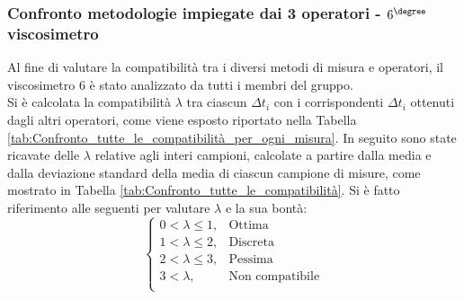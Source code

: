 \documentclass[a4paper,11pt,oneside]{article}
\begin{document}

\subsubsection*{Confronto metodologie impiegate dai 3 operatori - $6^{\degree}$ viscosimetro}%
Al fine di valutare la compatibilità tra i diversi metodi di misura e operatori, il viscosimetro 6 è stato analizzato da tutti i membri del gruppo.\\
Si è calcolata la compatibilità $\lambda$ tra ciascun $\Delta t_i$ con i corrispondenti $\Delta t_i$ ottenuti dagli  altri operatori, come viene esposto riportato nella Tabella \ref{tab:Confronto_tutte_le_compatibilità_per_ogni_misura}.
In seguito sono state ricavate delle $\lambda$ relative agli interi campioni, calcolate a partire dalla media e dalla deviazione standard della media di ciascun campione di misure, come mostrato in Tabella \ref{tab:Confronto_tutte_le_compatibilità}. Si è fatto riferimento alle seguenti per valutare $\lambda$ e la sua bontà:
\begin{equation*}%
    \label{eq:cases}
    \begin{cases}
    0<\lambda\leq 1, & \text{Ottima}\\
    1<\lambda\leq2, & \text{Discreta}\\
    2<\lambda\leq3, & \text{Pessima}\\
    3<\lambda, & \text{Non compatibile}\\
    \end{cases}
\end{equation*}
\end{document}
